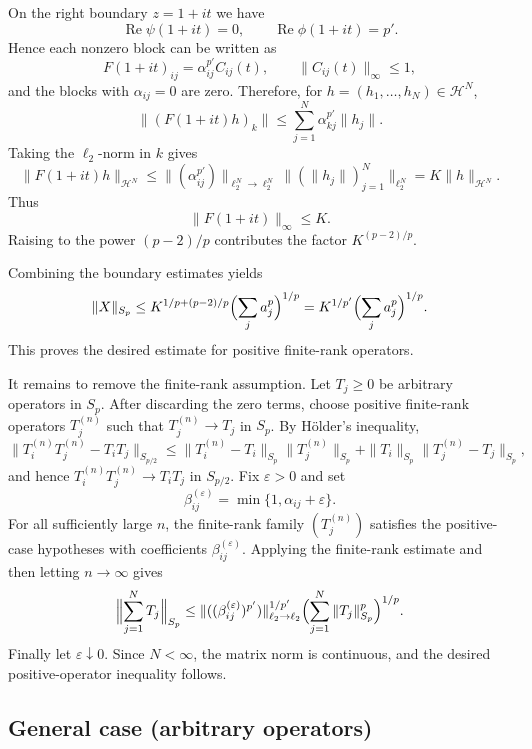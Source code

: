 \documentclass[10pt,a4paper]{amsart}
\newcommand{\1}{\mathbf{1}}
\begin{document}
On the right boundary $z=1+it$ we have
\[
\operatorname{Re}\psi(1+it)=0,\qquad \operatorname{Re}\phi(1+it)=p'.
\]
Hence each nonzero block can be written as
\[
F(1+it)_{ij}=\alpha_{ij}^{p'} C_{ij}(t),
\qquad \|C_{ij}(t)\|_{\infty}\le 1,
\]
and the blocks with $\alpha_{ij}=0$ are zero. Therefore, for
$h=(h_1,\dots,h_N)\in \mathcal H^N$,
\[
\|(F(1+it)h)_k\|
\le
\sum_{j=1}^N \alpha_{kj}^{p'}\|h_j\|.
\]
Taking the $\ell_2$-norm in $k$ gives
\[
\|F(1+it)h\|_{\mathcal H^N}
\le
\|(\alpha_{ij}^{p'})\|_{\ell_2^N\to\ell_2^N}
\bigl\|(\|h_j\|)_{j=1}^N\bigr\|_{\ell_2^N}
=
K\|h\|_{\mathcal H^N}.
\]
Thus
\[
\|F(1+it)\|_\infty\le K.
\]
Raising to the power $(p-2)/p$ contributes the factor $K^{(p-2)/p}$.

Combining the boundary estimates yields
\[
\|X\|_{S_p}\leq K^{1/p+(p-2)/p}\Bigl(\sum_j a_j^p\Bigr)^{1/p}=K^{1/p'}\Bigl(\sum_j a_j^p\Bigr)^{1/p}.
\]
This proves the desired estimate for positive finite-rank operators.

It remains to remove the finite-rank assumption. Let $T_j\ge0$ be arbitrary
operators in $S_p$. After discarding the zero terms, choose positive finite-rank
operators $T_j^{(n)}$ such that $T_j^{(n)}\to T_j$ in $S_p$. By Hölder's
inequality,
\[
\|T_i^{(n)}T_j^{(n)}-T_iT_j\|_{S_{p/2}}
\le
\|T_i^{(n)}-T_i\|_{S_p}\|T_j^{(n)}\|_{S_p}
+
\|T_i\|_{S_p}\|T_j^{(n)}-T_j\|_{S_p},
\]
and hence $T_i^{(n)}T_j^{(n)}\to T_iT_j$ in $S_{p/2}$. Fix $\varepsilon>0$ and set
\[
\beta_{ij}^{(\varepsilon)}=\min\{1,\alpha_{ij}+\varepsilon\}.
\]
For all sufficiently large $n$, the finite-rank family $(T_j^{(n)})$ satisfies
the positive-case hypotheses with coefficients $\beta_{ij}^{(\varepsilon)}$.
Applying the finite-rank estimate and then letting $n\to\infty$ gives
\[
\Bigl\|\sum_{j=1}^N T_j\Bigr\|_{S_p}
\le
\|((\beta_{ij}^{(\varepsilon)})^{p'})\|_{\ell_2\to\ell_2}^{1/p'}
\Bigl(\sum_{j=1}^N\|T_j\|_{S_p}^p\Bigr)^{1/p}.
\]
Finally let $\varepsilon\downarrow0$. Since $N<\infty$, the matrix norm is
continuous, and the desired positive-operator inequality follows.

\subsection{General case (arbitrary operators)}
\label{subsec:general}
\end{document}
